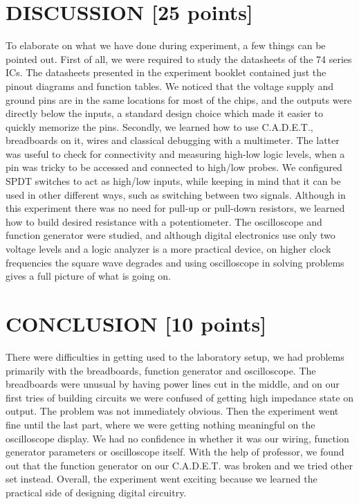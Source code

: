 \documentclass[pdftex,12pt,a4paper]{article}
\begin{document}
\section{DISCUSSION [25 points]} 
To elaborate on what we have done during experiment, a few things can be pointed out. First of all, we were required to study the datasheets of the 74 series ICs. The datasheets presented in the experiment booklet contained just the pinout diagrams and function tables. We noticed that the voltage supply and ground pins are in the same locations for most of the chips, and the outputs were directly below the inputs, a standard design choice which made it easier to quickly memorize the pins. Secondly, we learned how to use C.A.D.E.T., breadboards on it, wires and classical debugging with a multimeter. The latter was useful to check for connectivity and measuring high-low logic levels, when a pin was tricky to be accessed and connected to high/low probes. We configured SPDT switches to act as high/low inputs, while keeping in mind that it can be used in other different ways, such as switching between two signals. Although in this experiment there was no need for pull-up or pull-down resistors, we learned how to build desired resistance with a potentiometer. The oscilloscope and function generator were studied, and although digital electronics use only two voltage levels and a logic analyzer is a more practical device, on higher clock frequencies the square wave degrades and using oscilloscope in solving problems gives a full picture of what is going on.

\section{CONCLUSION [10 points]}
There were difficulties in getting used to the laboratory setup, we had problems primarily with the breadboards, function generator and oscilloscope. The breadboards were unusual by having power lines cut in the middle, and on our first tries of building circuits we were confused of getting high impedance state on output. The problem was not immediately obvious. Then the experiment went fine until the last part, where we were getting nothing meaningful on the oscilloscope display. We had no confidence in whether it was our wiring, function generator parameters or oscilloscope itself. With the help of professor, we found out that the function generator on our C.A.D.E.T. was broken and we tried other set instead. Overall, the experiment went exciting because we learned the practical side of designing digital circuitry.

\newpage
{}



\end{document}
